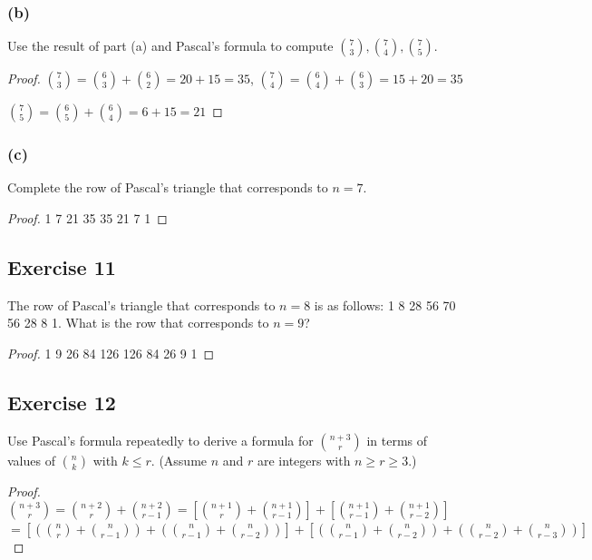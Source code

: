 \documentclass[14pt]{extarticle}
\begin{document}
\subsubsection{(b)}
Use the result of part (a) and Pascal’s formula to compute
\(\binom{7}{3}, \binom{7}{4}, \binom{7}{5}\).

\begin{proof}
     \(\binom{7}{3} = \binom{6}{3} + \binom{6}{2} = 20 + 15 = 35\),
     \(\binom{7}{4} = \binom{6}{4} + \binom{6}{3} = 15 + 20 = 35\)

     \(\binom{7}{5} = \binom{6}{5} + \binom{6}{4} = 6 + 15 = 21\)
\end{proof}

\subsubsection{(c)}
Complete the row of Pascal’s triangle that corresponds to \(n = 7\).

\begin{proof}
     1 7 21 35 35 21 7 1
\end{proof}

\subsection{Exercise 11}
The row of Pascal’s triangle that corresponds to \(n = 8\) is as follows: 1 8 28 56 70 56 28 8 1. What is the row that
corresponds to \(n = 9\)?

\begin{proof}
     1 9 26 84 126 126 84 26 9 1
\end{proof}

\subsection{Exercise 12}
Use Pascal’s formula repeatedly to derive a formula for \(\binom{n+3}{r}\) in terms of values of \(\binom{n}{k}\) with
\(k \leq r\). (Assume \(n\) and \(r\) are integers with \(n \geq r \geq 3\).)

\begin{proof}
     \(\binom{n+3}{r} = \binom{n+2}{r} + \binom{n+2}{r-1} = \left[\binom{n+1}{r} + \binom{n+1}{r-1}\right] +
     \left[\binom{n+1}{r-1} + \binom{n+1}{r-2}\right]\)
     \newpage
     \(= \left[\left(\binom{n}{r} + \binom{n}{r-1}\right) + \left(\binom{n}{r-1} + \binom{n}{r-2}\right)\right] +
     \left[\left(\binom{n}{r-1} + \binom{n}{r-2}\right) + \left(\binom{n}{r-2} + \binom{n}{r-3}\right)\right]\)
\end{proof}
\end{document}
